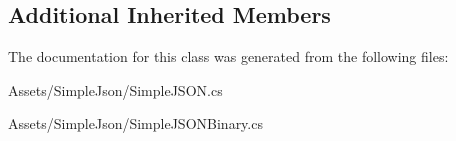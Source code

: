 \subsection*{Additional Inherited Members}


The documentation for this class was generated from the following files\+:\begin{DoxyCompactItemize}
\item 
Assets/\+Simple\+Json/Simple\+J\+S\+O\+N.\+cs\item 
Assets/\+Simple\+Json/Simple\+J\+S\+O\+N\+Binary.\+cs\end{DoxyCompactItemize}
